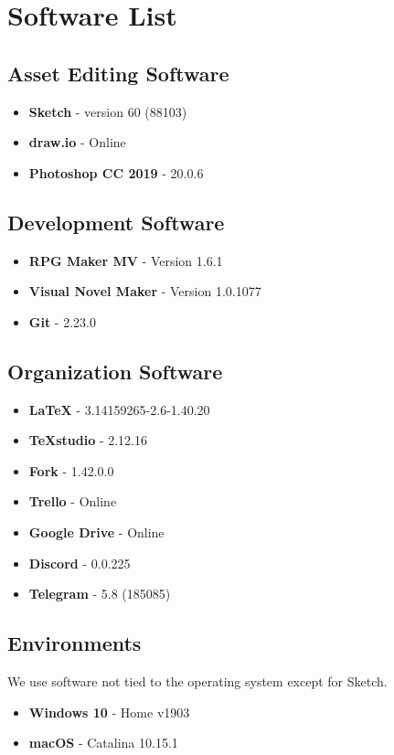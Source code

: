 \section{Software List}

\subsection{Asset Editing Software}

\begin{itemize}
	\item \textbf{Sketch} - version 60 (88103)
	\item \textbf{draw.io} - Online
	\item \textbf{Photoshop CC 2019} - 20.0.6
\end{itemize}


\subsection{Development Software}

\begin{itemize}
	\item \textbf{RPG Maker MV} - Version 1.6.1
	\item \textbf{Visual Novel Maker} - Version 1.0.1077
	\item \textbf{Git} - 2.23.0
\end{itemize}

\subsection{Organization Software}

\begin{itemize}
	\item \textbf{LaTeX} - 3.14159265-2.6-1.40.20
	\item \textbf{TeXstudio} - 2.12.16
	\item \textbf{Fork} - 1.42.0.0
	\item \textbf{Trello} - Online
	\item \textbf{Google Drive} - Online
	\item \textbf{Discord} - 0.0.225
	\item \textbf{Telegram} - 5.8 (185085)
\end{itemize}

\subsection{Environments}
We use software not tied to the operating system except for Sketch.

\begin{itemize}
	\item \textbf{Windows 10} - Home v1903
	\item \textbf{macOS} - Catalina 10.15.1
\end{itemize}
